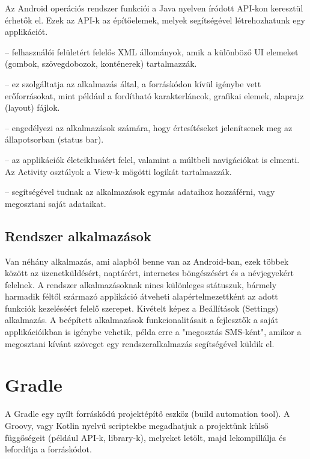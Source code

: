 Az Android operációs rendszer funkciói a Java nyelven íródott API-kon keresztül érhetők el. Ezek az API-k az építőelemek, melyek segítségével létrehozhatunk egy applikációt.

\begin{description}
	\setlength{\itemsep}{0.04mm}
	\item[View rendszer] -- felhasználói felületért felelős XML állományok, amik a különböző UI elemeket (gombok, szövegdobozok, konténerek) tartalmazzák.
	\item[Erőforráskezelő (Resource Manager)] -- ez szolgáltatja az alkalmazás által, a forráskódon kívül igénybe vett erőforrásokat, mint például a fordítható karakterláncok, grafikai elemek, alaprajz (layout) fájlok.
	\item[Értesítéskezelő (Notification Manager)] -- engedélyezi az alkalmazások számára, hogy értesítéseket jelenítsenek meg az állapotsorban (status bar).
	\item[Activity-kezelő] -- az applikációk életciklusáért felel, valamint a múltbeli navigációkat is elmenti. Az Activity osztályok a View-k mögötti logikát tartalmazzák.
	\item[Tartalom szolgáltató (Content Provider)] -- segítségével tudnak az alkalmazások egymás adataihoz hozzáférni, vagy megosztani saját adataikat.
\end{description}

\subsection{Rendszer alkalmazások}

Van néhány alkalmazás, ami alapból benne van az Android-ban, ezek többek között az üzenetküldésért, naptárért, internetes böngészésért és a névjegyekért felelnek. A rendszer alkalmazásoknak nincs különleges státuszuk, bármely harmadik féltől származó applikáció átveheti alapértelmezettként az adott funkciók kezeléséért felelő szerepet. Kivételt képez a Beállítások (Settings) alkalmazás. A beépített alkalmazások funkcionalitásait a fejlesztők a saját applikációikban is igénybe vehetik, példa erre a "megosztás SMS-ként", amikor a megosztani kívánt szöveget egy rendszeralkalmazás segítségével küldik el.


\section{Gradle}

A Gradle \cite{7} egy nyílt forráskódú projektépítő eszköz (build automation tool). A Groovy, vagy Kotlin nyelvű scriptekbe megadhatjuk a projektünk külső függőségeit (például API-k, library-k), melyeket letölt, majd lekompillálja és lefordítja a forráskódot.

